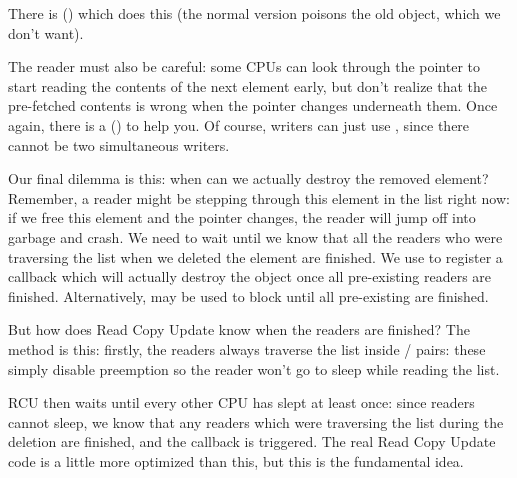 \documentclass[a4paper,8pt,english]{sphinxmanual}
\begin{document}
There is  () which
does this (the normal version poisons the old object, which we don't
want).

The reader must also be careful: some CPUs can look through the 
pointer to start reading the contents of the next element early, but
don't realize that the pre-fetched contents is wrong when the 
pointer changes underneath them. Once again, there is a
 ()
to help you. Of course, writers can just use
, since there cannot be two
simultaneous writers.

Our final dilemma is this: when can we actually destroy the removed
element? Remember, a reader might be stepping through this element in
the list right now: if we free this element and the  pointer
changes, the reader will jump off into garbage and crash. We need to
wait until we know that all the readers who were traversing the list
when we deleted the element are finished. We use
 to register a callback which will actually
destroy the object once all pre-existing readers are finished.
Alternatively,  may be used to block
until all pre-existing are finished.

But how does Read Copy Update know when the readers are finished? The
method is this: firstly, the readers always traverse the list inside
/ pairs:
these simply disable preemption so the reader won't go to sleep while
reading the list.

RCU then waits until every other CPU has slept at least once: since
readers cannot sleep, we know that any readers which were traversing the
list during the deletion are finished, and the callback is triggered.
The real Read Copy Update code is a little more optimized than this, but
this is the fundamental idea.
\end{document}
